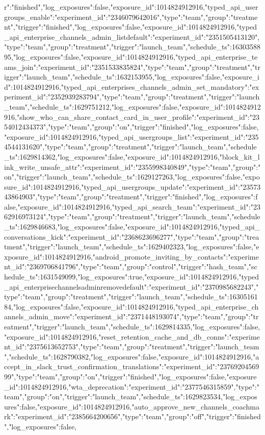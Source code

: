 {r":"finished","log_exposures":false,"exposure_id":1014824912916},"typed_api_usergroups_enable":{"experiment_id":"2346079642016","type":"team","group":"treatment","trigger":"finished","log_exposures":false,"exposure_id":1014824912916},"typed_api_enterprise_channels_admin_listdefault":{"experiment_id":"2351505413120","type":"team","group":"treatment","trigger":"launch_team","schedule_ts":1630358895,"log_exposures":false,"exposure_id":1014824912916},"typed_api_enterprise_teams_join":{"experiment_id":"2351533835824","type":"team","group":"treatment","trigger":"launch_team","schedule_ts":1632153955,"log_exposures":false,"exposure_id":1014824912916},"typed_api_enterprises_channels_admin_set_mandatory":{"experiment_id":"2352939283794","type":"team","group":"treatment","trigger":"launch_team","schedule_ts":1629751212,"log_exposures":false,"exposure_id":1014824912916},"show_who_can_share_contact_card_in_user_profile":{"experiment_id":"2354012434373","type":"team","group":"on","trigger":"finished","log_exposures":false,"exposure_id":1014824912916},"typed_api_usergroups_list":{"experiment_id":"2354544131620","type":"team","group":"treatment","trigger":"launch_team","schedule_ts":1629814362,"log_exposures":false,"exposure_id":1014824912916},"block_kit_link_write_unsafe_attr":{"experiment_id":"2355998340849","type":"team","group":"on","trigger":"launch_team","schedule_ts":1629127263,"log_exposures":false,"exposure_id":1014824912916},"typed_api_usergroups_update":{"experiment_id":"2357343864903","type":"team","group":"treatment","trigger":"finished","log_exposures":false,"exposure_id":1014824912916},"typed_api_search_team":{"experiment_id":"2362916973124","type":"team","group":"treatment","trigger":"launch_team","schedule_ts":1629846683,"log_exposures":false,"exposure_id":1014824912916},"typed_api_conversations_kick":{"experiment_id":"2368623696277","type":"team","group":"treatment","trigger":"launch_team","schedule_ts":1629402323,"log_exposures":false,"exposure_id":1014824912916},"android_promote_inviting_by_contacts":{"experiment_id":"2369706841796","type":"team","group":"control","trigger":"hash_team","schedule_ts":1631549099,"log_exposures":true,"exposure_id":1014824912916},"typed_api_enterprisechannelsadminremovedefault":{"experiment_id":"2370985682243","type":"team","group":"treatment","trigger":"launch_team","schedule_ts":1630516184,"log_exposures":false,"exposure_id":1014824912916},"typed_api_enterprise_channels_admin_move":{"experiment_id":"2371448193074","type":"team","group":"treatment","trigger":"launch_team","schedule_ts":1629814335,"log_exposures":false,"exposure_id":1014824912916},"reset_retention_cache_and_db_conns":{"experiment_id":"2375613652753","type":"team","group":"treatment","trigger":"launch_team","schedule_ts":1628790382,"log_exposures":false,"exposure_id":1014824912916},"accept_in_slack_trust_confirmation_translations":{"experiment_id":"2376920456999","type":"team","group":"on","trigger":"finished","log_exposures":false,"exposure_id":1014824912916},"wta_deprecation":{"experiment_id":"2377546315859","type":"team","group":"on","trigger":"launch_team","schedule_ts":1629823534,"log_exposures":false,"exposure_id":1014824912916},"auto_approve_new_channels_coachmark":{"experiment_id":"2385664200656","type":"team","group":"off","trigger":"finished","log_exposures":false,}
